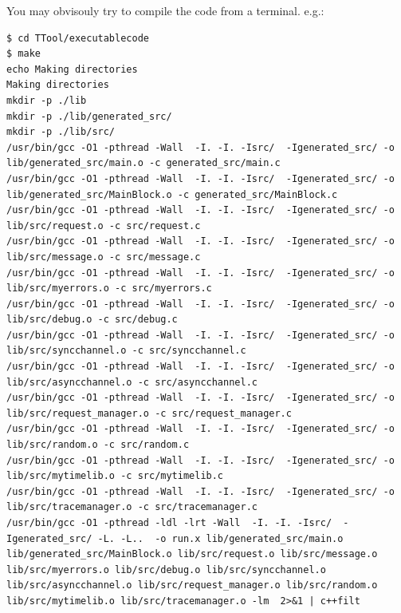 \documentclass[12pt]{article}
\begin{document}
You may obvisouly try to compile the code from a terminal. e.g.:
\begin{lstlisting}
$ cd TTool/executablecode
$ make
echo Making directories
Making directories
mkdir -p ./lib
mkdir -p ./lib/generated_src/
mkdir -p ./lib/src/ 
/usr/bin/gcc -O1 -pthread -Wall  -I. -I. -Isrc/  -Igenerated_src/ -o lib/generated_src/main.o -c generated_src/main.c
/usr/bin/gcc -O1 -pthread -Wall  -I. -I. -Isrc/  -Igenerated_src/ -o lib/generated_src/MainBlock.o -c generated_src/MainBlock.c
/usr/bin/gcc -O1 -pthread -Wall  -I. -I. -Isrc/  -Igenerated_src/ -o lib/src/request.o -c src/request.c
/usr/bin/gcc -O1 -pthread -Wall  -I. -I. -Isrc/  -Igenerated_src/ -o lib/src/message.o -c src/message.c
/usr/bin/gcc -O1 -pthread -Wall  -I. -I. -Isrc/  -Igenerated_src/ -o lib/src/myerrors.o -c src/myerrors.c
/usr/bin/gcc -O1 -pthread -Wall  -I. -I. -Isrc/  -Igenerated_src/ -o lib/src/debug.o -c src/debug.c
/usr/bin/gcc -O1 -pthread -Wall  -I. -I. -Isrc/  -Igenerated_src/ -o lib/src/syncchannel.o -c src/syncchannel.c
/usr/bin/gcc -O1 -pthread -Wall  -I. -I. -Isrc/  -Igenerated_src/ -o lib/src/asyncchannel.o -c src/asyncchannel.c
/usr/bin/gcc -O1 -pthread -Wall  -I. -I. -Isrc/  -Igenerated_src/ -o lib/src/request_manager.o -c src/request_manager.c
/usr/bin/gcc -O1 -pthread -Wall  -I. -I. -Isrc/  -Igenerated_src/ -o lib/src/random.o -c src/random.c
/usr/bin/gcc -O1 -pthread -Wall  -I. -I. -Isrc/  -Igenerated_src/ -o lib/src/mytimelib.o -c src/mytimelib.c
/usr/bin/gcc -O1 -pthread -Wall  -I. -I. -Isrc/  -Igenerated_src/ -o lib/src/tracemanager.o -c src/tracemanager.c
/usr/bin/gcc -O1 -pthread -ldl -lrt -Wall  -I. -I. -Isrc/  -Igenerated_src/ -L. -L..  -o run.x lib/generated_src/main.o lib/generated_src/MainBlock.o lib/src/request.o lib/src/message.o lib/src/myerrors.o lib/src/debug.o lib/src/syncchannel.o lib/src/asyncchannel.o lib/src/request_manager.o lib/src/random.o lib/src/mytimelib.o lib/src/tracemanager.o -lm  2>&1 | c++filt
\end{lstlisting}
\end{document}
